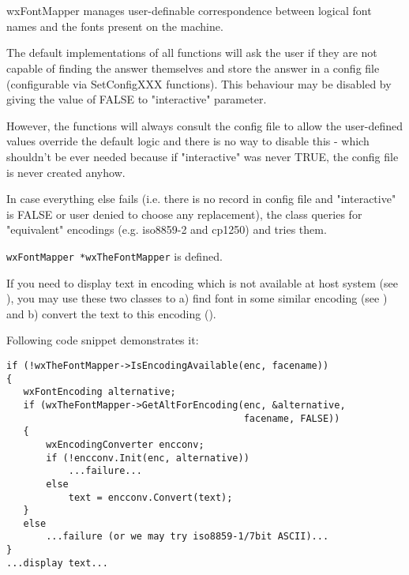 %
%

\section{}\label{wxfontmapper}

wxFontMapper manages user-definable correspondence between logical font
names and the fonts present on the machine.

The default implementations of all functions will ask the user if they are
not capable of finding the answer themselves and store the answer in a
config file (configurable via SetConfigXXX functions). This behaviour may
be disabled by giving the value of FALSE to "interactive" parameter.

However, the functions will always consult the config file to allow the
user-defined values override the default logic and there is no way to
disable this - which shouldn't be ever needed because if "interactive" was
never TRUE, the config file is never created anyhow.

In case everything else fails (i.e. there is no record in config file
and "interactive" is FALSE or user denied to choose any replacement), 
the class queries 
for "equivalent" encodings (e.g. iso8859-2 and cp1250) and tries them.


{\tt wxFontMapper *wxTheFontMapper} is defined.


If you need to display text in encoding which is not available at
host system (see ),
you may use these two classes to a) find font in some similar encoding
(see )
and
b) convert the text to this encoding 
().

Following code snippet demonstrates it:

\begin{verbatim}
if (!wxTheFontMapper->IsEncodingAvailable(enc, facename))
{
   wxFontEncoding alternative;
   if (wxTheFontMapper->GetAltForEncoding(enc, &alternative,
                                          facename, FALSE))
   {
       wxEncodingConverter encconv;
       if (!encconv.Init(enc, alternative))
           ...failure...
       else
           text = encconv.Convert(text);
   }
   else
       ...failure (or we may try iso8859-1/7bit ASCII)...
}
...display text...
\end{verbatim}


